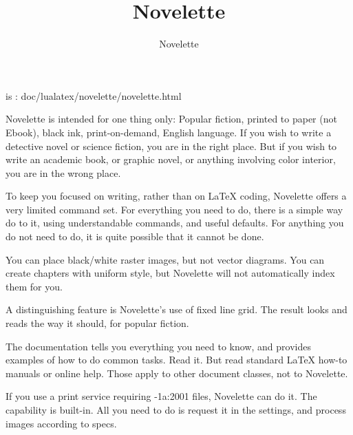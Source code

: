 \documentclass{novelette} %
\title{Novelette}
\author{Novelette}
\begin{document}
\mainmatter
\begin{opening}
\null\null
{}
\null\null
\end{opening}
 is :
doc/lualatex/novelette/novelette.html\par
\scene{-}
Novelette is intended for one thing only: Popular fiction, printed to paper
(not Ebook), black ink, print-on-demand, English language.
If you wish to write a detective novel or science fiction, you are in the
right place. But if you wish to write an academic book, or graphic novel,
or anything involving color interior, you are in the wrong place.

To keep you focused on writing, rather than on LaTeX coding, Novelette offers
a very limited command set. For everything you need to do, there is a simple
way do to it, using understandable commands, and useful defaults. For anything
you do not need to do, it is quite possible that it cannot be done.

You can place black/white raster images, but not vector diagrams. You can
create chapters with uniform style, but Novelette will not automatically
index them for you.

A distinguishing feature is Novelette's use of fixed line grid. The result
looks and reads the way it should, for popular fiction.

The  documentation tells you everything you need to know,
and provides examples of how to do common tasks. Read it. But 
read standard LaTeX how-to manuals or online help. Those apply to other
document classes, not to Novelette.

If you use a print service requiring -1a:2001 files, Novelette
can do it. The capability is built-in. All you need to do is request it in the
settings, and process images according to specs.
\end{document}
